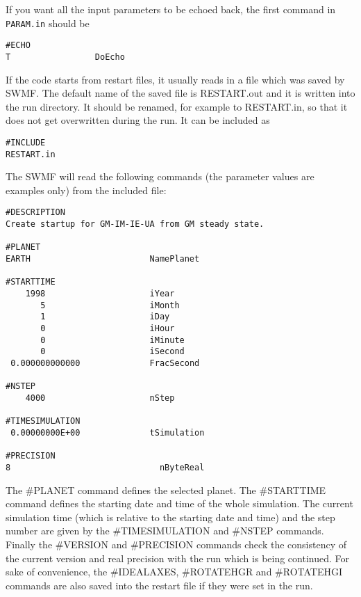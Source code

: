 If you want all the input parameters to be echoed back, the first
command in {\tt PARAM.in} should be
\begin{verbatim}
#ECHO
T                 DoEcho
\end{verbatim}
If the code starts from restart files, it usually reads in a
file which was saved by SWMF. The default name of the saved
file is RESTART.out and it is written into the run directory.
It should be renamed, for example to RESTART.in, so that it
does not get overwritten during the run. It can be included as
\begin{verbatim}
#INCLUDE
RESTART.in
\end{verbatim}
The SWMF will read the following commands (the parameter values are
examples only) from the included file:
\begin{verbatim}
#DESCRIPTION
Create startup for GM-IM-IE-UA from GM steady state.

#PLANET
EARTH                        NamePlanet

#STARTTIME
    1998                     iYear
       5                     iMonth
       1                     iDay
       0                     iHour
       0                     iMinute
       0                     iSecond
 0.000000000000              FracSecond
 
#NSTEP
    4000                     nStep
 
#TIMESIMULATION
 0.00000000E+00              tSimulation
 
#PRECISION
8                              nByteReal
\end{verbatim}
The \#PLANET command defines the selected planet.
The \#STARTTIME command defines the starting date and time of the whole
simulation. The current simulation time (which is relative to
the starting date and time) and the step number are
given by the \#TIMESIMULATION and \#NSTEP commands. Finally
the \#VERSION and \#PRECISION commands check the consistency
of the current version and real precision with the run which
is being continued. For sake of convenience, the \#IDEALAXES,
\#ROTATEHGR and \#ROTATEHGI commands are also saved 
into the restart file if they were set in the run.

